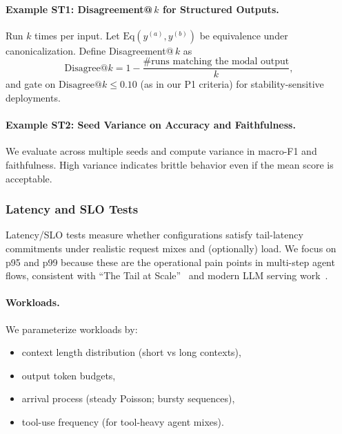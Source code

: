 \documentclass[11pt]{article}
\begin{document}
\paragraph{Example ST1: Disagreement@\,$k$ for Structured Outputs.}
Run $k$ times per input. Let $\mathrm{Eq}(y^{(a)},y^{(b)})$ be equivalence under canonicalization.
Define Disagreement@\,$k$ as
\[
\mathrm{Disagree}@k = 1 - \frac{\#\text{runs matching the modal output}}{k},
\]
and gate on \(\mathrm{Disagree}@k \le 0.10\) (as in our P1 criteria) for stability-sensitive deployments.

\paragraph{Example ST2: Seed Variance on Accuracy and Faithfulness.}
We evaluate across multiple seeds and compute variance in macro-F1 and faithfulness.
High variance indicates brittle behavior even if the mean score is acceptable.

\subsubsection{Latency and SLO Tests}

Latency/SLO tests measure whether configurations satisfy tail-latency commitments under realistic request mixes and (optionally) load.
We focus on p95 and p99 because these are the operational pain points in multi-step agent flows, consistent with “The Tail at Scale”~\citep{dean2013tail} and modern LLM serving work~\citep{kwon2023vllm,agrawal2024sarathi}.

\paragraph{Workloads.}
We parameterize workloads by:
\begin{itemize}[leftmargin=12pt]
    \item context length distribution (short vs long contexts),
    \item output token budgets,
    \item arrival process (steady Poisson; bursty sequences),
    \item tool-use frequency (for tool-heavy agent mixes).
\end{itemize}
\end{document}
